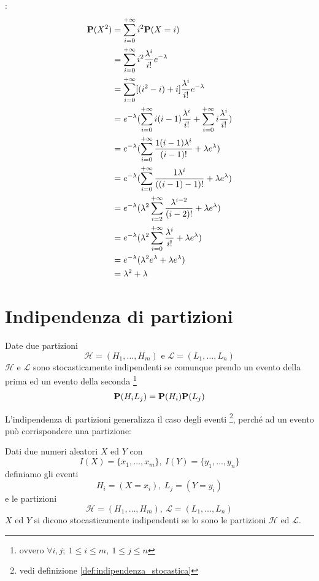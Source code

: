 :
\begin{align*}
  \mathbf{P}(X^2) &= \sum_{i=0}^{+ \infty} i^2 \mathbf{P}(X = i) \\
  &= \sum_{i=0}^{+ \infty} i^2 \frac{\lambda^i}{i!} e^{- \lambda} \\
  &= \sum_{i=0}^{+ \infty} [(i^2 - i) + i] \frac{\lambda^i}{i!} e^{- \lambda} \\
  &= e^{- \lambda} (\sum_{i=0}^{+ \infty} i(i - 1) \frac{\lambda^i}{i!} + \sum_{i=0}^{+ \infty} i \frac{\lambda^i}{i!}) \\
  &= e^{- \lambda} (\sum_{i=0}^{+ \infty} \frac{1(i - 1)\lambda^i}{(i-1)!} + \lambda e^\lambda) \\
  &= e^{- \lambda} (\sum_{i=0}^{+ \infty} \frac{1\lambda^i}{((i-1)-1)!} + \lambda e^\lambda) \\
  &= e^{- \lambda} (\lambda^2 \sum_{i=2}^{+ \infty} \frac{\lambda^{i-2}}{(i-2)!} + \lambda e^\lambda) \\
  &= e^{- \lambda} (\lambda^2 \sum_{i=0}^{+ \infty} \frac{\lambda^i}{i!} + \lambda e^\lambda) \\
  &= e^{- \lambda} (\lambda^2 e^\lambda + \lambda e^\lambda) \\
  &= \lambda^2 + \lambda
\end{align*}

\section{Indipendenza di partizioni} %
\begin{definition}
  \label{def:indipendenza_di_partizioni}
  Date due partizioni
  \[
    \mathcal{H} = (H_1, \ldots, H_m) \text{ e } \mathcal{L} = (L_1, \ldots, L_n)
  \]
  \( \mathcal{H} \) e \( \mathcal{L} \) sono stocasticamente indipendenti se comunque prendo un evento della prima ed un evento della seconda
  \footnote{ovvero \( \forall i, j; ~ 1 \le i \le m, ~ 1 \le j \le n \)}
  \[
    \mathbf{P}(H_i L_j) = \mathbf{P}(H_i) \mathbf{P}(L_j)
  \]
\end{definition}

L'indipendenza di partizioni generalizza il caso degli eventi
\footnote{vedi definizione \ref{def:indipendenza_stocastica}},
perché ad un evento può corrispondere una partizione:
\begin{definition}
  Dati due numeri aleatori \( X \) ed \( Y \) con
  \[
    I(X) = \{ x_1, \ldots, x_m \}, ~ I(Y) = \{ y_1, \ldots, y_n \}
  \]
  definiamo gli eventi
  \[
    H_i = (X = x_i), ~ L_j = (Y = y_i)
  \]
  e le partizioni
  \[
    \mathcal{H} = (H_1, \ldots, H_m), ~ \mathcal{L} = (L_1, \ldots, L_n)
  \]
  \( X \) ed \( Y \) si dicono stocasticamente indipendenti se lo sono le partizioni \( \mathcal{H} \) ed \( \mathcal{L} \).
\end{definition}
